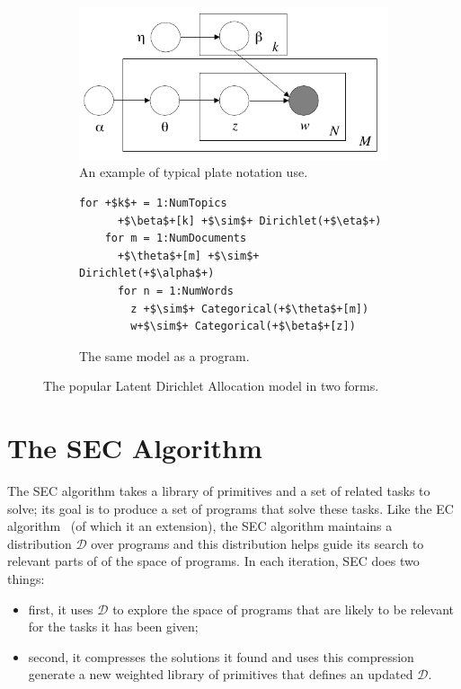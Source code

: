 \documentclass{article} %
\begin{document}


\begin{figure}[h]
\centering
\begin{subfigure}{.5\textwidth}
  \centering
\includegraphics[width=.7\linewidth]{./figures/lda_plate_blei.pdf}
  \caption{An example of typical plate notation use. \label{fig:lda_plate}}

\end{subfigure}%
\begin{subfigure}{.4\textwidth}
	\begin{lstlisting}[frame=single, numbers=none, xleftmargin=0pt]
	for +$k$+ = 1:NumTopics
	  +$\beta$+[k] +$\sim$+ Dirichlet(+$\eta$+)
	for m = 1:NumDocuments
	  +$\theta$+[m] +$\sim$+ Dirichlet(+$\alpha$+) 
	  for n = 1:NumWords 
	    z +$\sim$+ Categorical(+$\theta$+[m])
	    w+$\sim$+ Categorical(+$\beta$+[z])
	\end{lstlisting}
  \caption{The same model as a program.}
  \label{fig:lda_code}
\end{subfigure}
\caption{The popular Latent Dirichlet Allocation model in two forms.}
\label{fig:lda}
\end{figure}


\section{The SEC Algorithm}

The SEC algorithm takes a library of primitives and a set of related tasks to solve; its goal is to produce a set of programs that solve these tasks. Like the EC algorithm~\cite{DBLP:conf/ijcai/DechterMAT13} (of which it an extension), the SEC algorithm maintains a distribution $\mathcal{D}$ over programs and this distribution helps guide its search to relevant parts of of the space of programs. In each iteration, SEC does two things: 
\begin{itemize}
	\item first, it uses $\mathcal{D}$ to explore the space of programs that are likely to be relevant for the tasks it has been given;
	\item second, it compresses the solutions it found and uses this compression generate a new weighted library of primitives that defines an updated $\mathcal{D}$.
\end{itemize}
\end{document}

